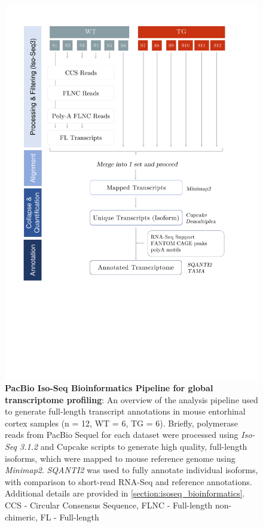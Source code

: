 \begin{figure}[htp]
	\centering
	\vspace{20pt}
	\includegraphics[page=1,trim={0 12cm 2cm 1cm},clip, scale = 0.45]{Figures/Pipeline.pdf}
	\captionsetup{width=0.95\textwidth}
	\caption[PacBio Iso-Seq Bioinformatics Pipeline for global transcriptome profiling]%
	{\textbf{PacBio Iso-Seq Bioinformatics Pipeline for global transcriptome profiling}: An overview of the analysis pipeline used to generate full-length transcript annotations in mouse entorhinal cortex samples (n = 12, WT = 6, TG = 6). Briefly, polymerase reads from PacBio Sequel for each dataset were processed using \textit{Iso-Seq 3.1.2} and Cupcake scripts to generate high quality, full-length isoforms, which were mapped to mouse reference genome using \textit{Minimap2}. \textit{SQANTI2} was used to fully annotate individual isoforms, with comparison to short-read RNA-Seq and reference annotations. Additional details are provided in \cref{section:isoseq_bioinformatics}. CCS - Circular Consensus Sequence, FLNC - Full-length non-chimeric, FL - Full-length}
	\label{fig:isoseq_whole_pipeline}
\end{figure}
 
